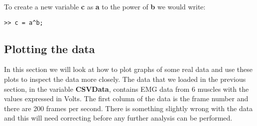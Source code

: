 \documentclass[12pt,a4paper]{article}
\begin{document}
To create a new variable \textbf{c} as \textbf{a} to the power of \textbf{b} we would write:
\begin{lstlisting}[style=Matlab-editor]
>> c = a^b;
\end{lstlisting}

\subsection{Plotting the data}
In this section we will look at how to plot graphs of some real data and use these plots to inspect the data more closely.  
The data that we loaded in the previous section, in the variable \textbf{CSVData}, contains EMG data from 6 muscles with the values expressed in Volts.  
The first column of the data is the frame number and there are 200 frames per second.  
There is something slightly wrong with the data and this will need correcting before any further analysis can be performed.
\end{document}
